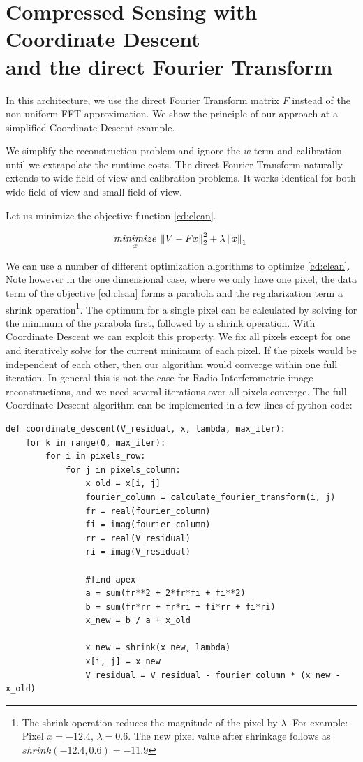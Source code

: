 \section{Compressed Sensing with Coordinate Descent\\ and the direct Fourier Transform}\label{cd}
In this architecture, we use the direct Fourier Transform matrix $F$ instead of the non-uniform FFT approximation. We show the principle of our approach at a simplified Coordinate Descent example. 


We simplify the reconstruction problem and ignore the $w$-term and calibration until we extrapolate the runtime costs. The direct Fourier Transform naturally extends to wide field of view and calibration problems. It works identical for both wide field of view and small field of view. 

Let us minimize the objective function \eqref{cd:clean}.



\begin{equation}\label{cd:clean}
\underset{x}{minimize} \: \left \| V - Fx \right \|_2^2 + \lambda \left \| x \right \|_1 \\
\end{equation}

We can use a number of different optimization algorithms to optimize \eqref{cd:clean}. Note however in the one dimensional case, where we only have one pixel, the data term of the objective \eqref{cd:clean} forms a parabola and the regularization term a shrink operation\footnote{The shrink operation reduces the magnitude of the pixel by $\lambda$. For example: Pixel $x = -12.4$, $\lambda = 0.6$. The new pixel value after shrinkage follows as $shrink(-12.4, 0.6) = -11.9$}. The optimum for a single pixel can be calculated by solving for the minimum of the parabola first, followed by a shrink operation. With Coordinate Descent we can exploit this property. We fix all pixels except for one and iteratively solve for the current minimum of each pixel. If the pixels would be independent of each other, then our algorithm would converge within one full iteration. In general this is not the case for Radio Interferometric image reconstructions, and we need several iterations over all pixels converge. The full Coordinate Descent algorithm can be implemented in a few lines of python code:

\begin{lstlisting} 
def coordinate_descent(V_residual, x, lambda, max_iter):
	for k in range(0, max_iter):
		for i in pixels_row:
			for j in pixels_column:
				x_old = x[i, j]
				fourier_column = calculate_fourier_transform(i, j)
				fr = real(fourier_column)
				fi = imag(fourier_column)
				rr = real(V_residual)
				ri = imag(V_residual)
				
				#find apex
				a = sum(fr**2 + 2*fr*fi + fi**2)
				b = sum(fr*rr + fr*ri + fi*rr + fi*ri)
				x_new = b / a + x_old
				
				x_new = shrink(x_new, lambda)
				x[i, j] = x_new
				V_residual = V_residual - fourier_column * (x_new - x_old)
\end{lstlisting}\label{cd:basic}

